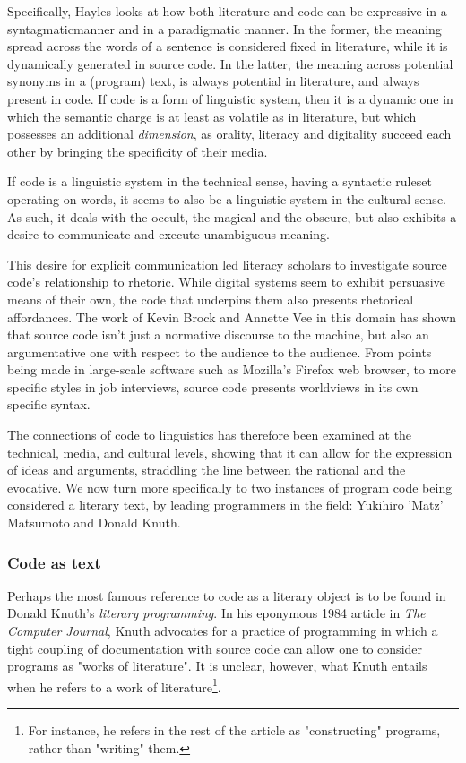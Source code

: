 Specifically, Hayles looks at how both literature and code can be expressive in a syntagmaticmanner and in a paradigmatic manner. In the former, the meaning spread across the words of a sentence is considered fixed in literature, while it is dynamically generated in source code. In the latter, the meaning across potential synonyms in a (program) text, is always potential in literature, and always present in code\cite{hayles_print_2004}. If code is a form of linguistic system, then it is a dynamic one in which the semantic charge is at least as volatile as in literature, but which possesses an additional \emph{dimension}, as orality, literacy and digitality succeed each other by bringing the specificity of their media.

If code is a linguistic system in the technical sense, having a syntactic ruleset operating on words, it seems to also be a linguistic system in the cultural sense. As such, it deals with the occult, the magical and the obscure, but also exhibits a desire to communicate and execute unambiguous meaning.

This desire for explicit communication led literacy scholars to investigate source code's relationship to rhetoric. While digital systems seem to exhibit persuasive means of their own\cite{bogost_rhetoric_2007}\cite{frasca_simulation_2013}, the code that underpins them also presents rhetorical affordances. The work of Kevin Brock and Annette Vee in this domain has shown that source code isn't just a normative discourse to the machine, but also an argumentative one with respect to the audience to the audience. From points being made in large-scale software such as Mozilla's Firefox web browser, to more specific styles in job interviews, source code presents worldviews in its own specific syntax\cite{brock_rhetorical_2019}.

The connections of code to linguistics has therefore been examined at the technical, media, and cultural levels, showing that it can allow for the expression of ideas and arguments, straddling the line between the rational and the evocative. We now turn more specifically to two instances of program code being considered a literary text, by leading programmers in the field: Yukihiro 'Matz' Matsumoto and Donald Knuth.

\subsubsection{Code as text}

Perhaps the most famous reference to code as a literary object is to be found in Donald Knuth's \emph{literary programming}. In his eponymous 1984 article in \emph{The Computer Journal}, Knuth advocates for a practice of programming in which a tight coupling of documentation with source code can allow one to consider programs as "works of literature"\cite{knuth_literate_1984}. It is unclear, however, what Knuth entails when he refers to a work of literature\footnote{For instance, he refers in the rest of the article as "constructing" programs, rather than "writing" them.}.

